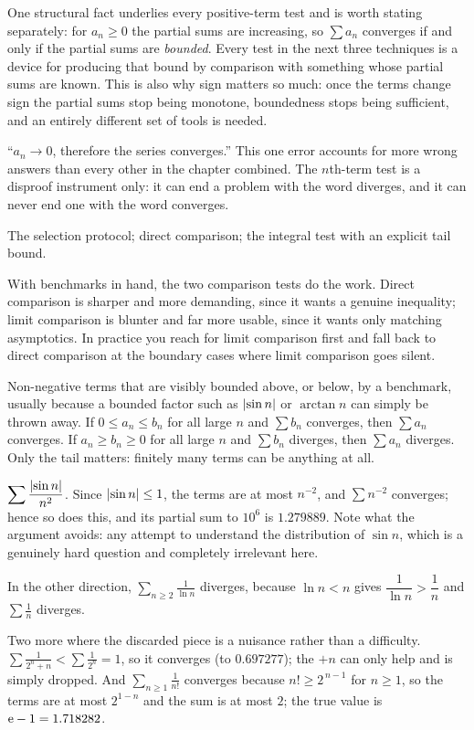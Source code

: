 One structural fact underlies every positive-term test and is worth stating separately: for $a_n\geq0$ the partial sums are increasing, so $\sum a_n$ converges if and only if the partial sums are \emph{bounded}. Every test in the next three techniques is a device for producing that bound by comparison with something whose partial sums are known. This is also why sign matters so much: once the terms change sign the partial sums stop being monotone, boundedness stops being sufficient, and an entirely different set of tools is needed.

\begin{trap}
``$a_n\to0$, therefore the series converges.'' This one error accounts for more wrong answers than every other in the chapter combined. The $n$th-term test is a disproof instrument only: it can end a problem with the word diverges, and it can never end one with the word converges.
\end{trap}

\begin{seealsob}The selection protocol; direct comparison; the integral test with an explicit tail bound.\end{seealsob}

With benchmarks in hand, the two comparison tests do the work. Direct comparison is sharper and more demanding, since it wants a genuine inequality; limit comparison is blunter and far more usable, since it wants only matching asymptotics. In practice you reach for limit comparison first and fall back to direct comparison at the boundary cases where limit comparison goes silent.

\cue Non-negative terms that are visibly bounded above, or below, by a benchmark, usually because a bounded factor such as $\left\lvert \sin n\right\rvert$ or $\arctan n$ can simply be thrown away.
\method If $0\leq a_n\leq b_n$ for all large $n$ and $\sum b_n$ converges, then $\sum a_n$ converges. If $a_n\geq b_n\geq0$ for all large $n$ and $\sum b_n$ diverges, then $\sum a_n$ diverges. Only the tail matters: finitely many terms can be anything at all.

\begin{worked}
$\displaystyle\sum\frac{\left\lvert \sin n\right\rvert}{n^2}$. Since $\left\lvert \sin n\right\rvert\leq1$, the terms are at most $n^{-2}$, and $\sum n^{-2}$ converges; hence so does this, and its partial sum to $10^6$ is $1.279889$. Note what the argument avoids: any attempt to understand the distribution of $\sin n$, which is a genuinely hard question and completely irrelevant here.

In the other direction, $\displaystyle\sum_{n\geq2}\frac{1}{\ln n}$ diverges, because $\ln n<n$ gives $\dfrac{1}{\ln n}>\dfrac1n$ and $\sum\tfrac1n$ diverges.

Two more where the discarded piece is a nuisance rather than a difficulty. $\displaystyle\sum\frac{1}{2^{n}+n}<\sum\frac{1}{2^{n}}=1$, so it converges (to $0.697277$); the $+n$ can only help and is simply dropped. And $\displaystyle\sum_{n\geq1}\frac{1}{n!}$ converges because $n!\geq2^{\,n-1}$ for $n\geq1$, so the terms are at most $2^{1-n}$ and the sum is at most $2$; the true value is $\mathrm{e}-1=1.718282$.
\end{worked}

